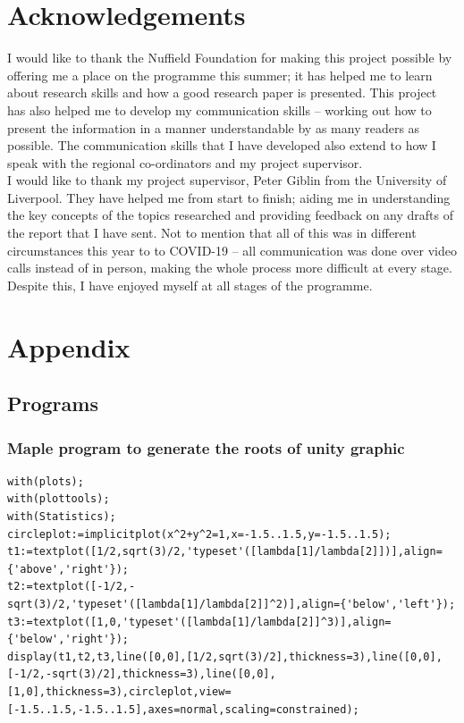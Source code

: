\documentclass[12pt]{article}
\begin{document}
\newpage
\section{Acknowledgements}
I would like to thank the Nuffield Foundation for making this project possible by offering me a place on the programme this summer; it has helped me to learn about research skills and how a good research paper is presented. This project has also helped me to develop my communication skills -- working out how to present the information in a manner understandable by as many readers as possible. The communication skills that I have developed also extend to how I speak with the regional co-ordinators and my project supervisor.\\
I would like to thank my project supervisor, Peter Giblin from the University of Liverpool. They have helped me from start to finish; aiding me in understanding the key concepts of the topics researched and providing feedback on any drafts of the report that I have sent. Not to mention that all of this was in different circumstances this year to to COVID-19 -- all communication was done over video calls instead of in person, making the whole process more difficult at every stage. Despite this, I have enjoyed myself at all stages of the programme.
\newpage

\newpage
\section{Appendix}
\subsection{Programs}
\subsubsection{Maple program to generate the roots of unity graphic}
\begin{lstlisting}
with(plots);
with(plottools);
with(Statistics);
circleplot:=implicitplot(x^2+y^2=1,x=-1.5..1.5,y=-1.5..1.5);
t1:=textplot([1/2,sqrt(3)/2,'typeset'([lambda[1]/lambda[2]])],align={'above','right'});
t2:=textplot([-1/2,-sqrt(3)/2,'typeset'([lambda[1]/lambda[2]]^2)],align={'below','left'});
t3:=textplot([1,0,'typeset'([lambda[1]/lambda[2]]^3)],align={'below','right'});
display(t1,t2,t3,line([0,0],[1/2,sqrt(3)/2],thickness=3),line([0,0],[-1/2,-sqrt(3)/2],thickness=3),line([0,0],[1,0],thickness=3),circleplot,view=[-1.5..1.5,-1.5..1.5],axes=normal,scaling=constrained);
\end{lstlisting}
\end{document}
